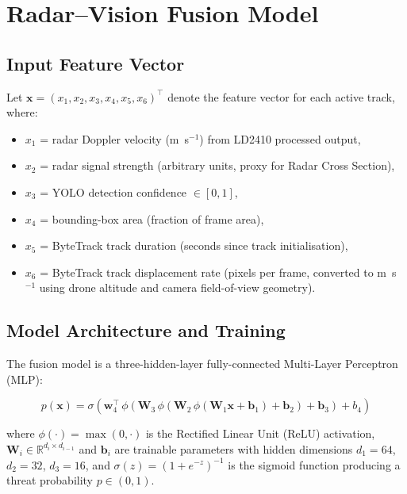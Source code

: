 \section{Radar--Vision Fusion Model}
\label{sec:fusion}

\subsection{Input Feature Vector}
Let $\mathbf{x} = (x_1, x_2, x_3, x_4, x_5, x_6)^\top$ denote the feature vector for each active track, where:
\begin{itemize}
    \item $x_1$ = radar Doppler velocity (m~s$^{-1}$) from LD2410 processed output,
    \item $x_2$ = radar signal strength (arbitrary units, proxy for Radar Cross Section),
    \item $x_3$ = YOLO detection confidence $\in [0, 1]$,
    \item $x_4$ = bounding-box area (fraction of frame area),
    \item $x_5$ = ByteTrack track duration (seconds since track initialisation),
    \item $x_6$ = ByteTrack track displacement rate (pixels per frame, converted to m~s$^{-1}$ using drone altitude and camera field-of-view geometry).
\end{itemize}

\subsection{Model Architecture and Training}
The fusion model is a three-hidden-layer fully-connected Multi-Layer Perceptron (MLP):

\begin{equation}
p(\mathbf{x}) = \sigma\!\left( \mathbf{w}_4^\top \, \phi\!\left( \mathbf{W}_3 \, \phi\!\left( \mathbf{W}_2 \, \phi(\mathbf{W}_1 \mathbf{x} + \mathbf{b}_1) + \mathbf{b}_2 \right) + \mathbf{b}_3 \right) + b_4 \right)
\label{eq:fusion_mlp}
\end{equation}

\noindent where $\phi(\cdot) = \max(0, \cdot)$ is the Rectified Linear Unit (ReLU) activation, $\mathbf{W}_i \in \mathbb{R}^{d_{i} \times d_{i-1}}$ and $\mathbf{b}_i$ are trainable parameters with hidden dimensions $d_1{=}64$, $d_2{=}32$, $d_3{=}16$, and $\sigma(z) = (1 + e^{-z})^{-1}$ is the sigmoid function producing a threat probability $p \in (0, 1)$.

